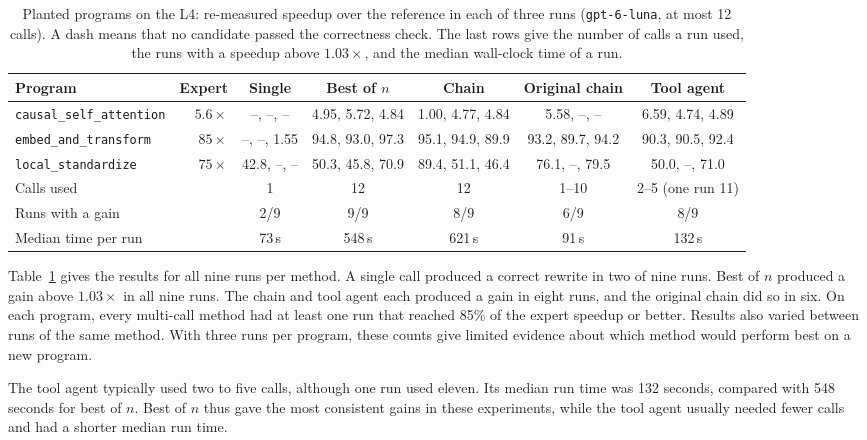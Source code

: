 \documentclass[conference]{IEEEtran}
\begin{document}
\begin{table}[t]
  \centering
  \caption{Planted programs on the L4: re-measured speedup over the reference
  in each of three runs (\texttt{gpt-6-luna}, at most 12 calls). A dash means
  that no candidate passed the correctness check. The last rows give the
  number of calls a run used, the runs with a speedup above $1.03\times$,
  and the median wall-clock time of a run.}
  \label{tab:planted}
  \begin{tabular}{@{}lrccccc@{}}
    \toprule
    Program & Expert & Single & Best of $n$ & Chain & Original chain & Tool agent \\
    \midrule
    \texttt{causal\_self\_attention} & $5.6\times$ & --, --, -- & 4.95, 5.72, 4.84 & 1.00, 4.77, 4.84 & 5.58, --, -- & 6.59, 4.74, 4.89 \\
    \texttt{embed\_and\_transform} & $85\times$ & --, --, 1.55 & 94.8, 93.0, 97.3 & 95.1, 94.9, 89.9 & 93.2, 89.7, 94.2 & 90.3, 90.5, 92.4 \\
    \texttt{local\_standardize} & $75\times$ & 42.8, --, -- & 50.3, 45.8, 70.9 & 89.4, 51.1, 46.4 & 76.1, --, 79.5 & 50.0, --, 71.0 \\
    \midrule
    Calls used & & 1 & 12 & 12 & 1--10 & 2--5 (one run 11) \\
    Runs with a gain & & 2/9 & 9/9 & 8/9 & 6/9 & 8/9 \\
    Median time per run & & 73\,s & 548\,s & 621\,s & 91\,s & 132\,s \\
    \bottomrule
  \end{tabular}
\end{table}

Table~\ref{tab:planted} gives the results for all nine runs per method. A single call
produced a correct rewrite in two of nine runs. Best of
$n$ produced a gain above $1.03\times$ in all nine runs. The chain and
tool agent each produced a gain in eight runs, and the original chain
did so in six. On each program, every multi-call method had at least one
run that reached 85\% of the expert speedup or better. Results also
varied between runs of the same method. With three runs per program,
these counts give limited evidence about which method would perform
best on a new program.

The tool agent typically used two to five calls, although one run used
eleven. Its median run time was 132 seconds, compared with 548 seconds
for best of $n$. Best of $n$ thus gave the most consistent gains in
these experiments, while the tool agent usually needed fewer calls and
had a shorter median run time.
\end{document}
